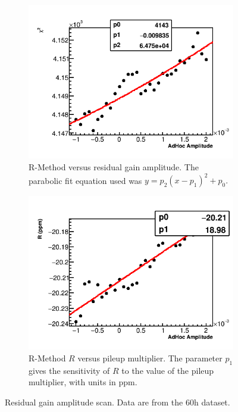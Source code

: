 \begin{figure}[h]
    \begin{subfigure}[t]{0.45\textwidth}
        \centering
        \includegraphics[width=\textwidth]{FullRatio_Chi2_Vs_AdHocAmplitude_Canv}
        \caption{R-Method \chisq versus residual gain amplitude. The parabolic fit equation used was $y = p_{2}(x - p_{1})^{2} + p_{0}.$}
    \end{subfigure}%
    \hspace{1cm}
    \begin{subfigure}[t]{0.45\textwidth}
        \centering
        \includegraphics[width=\textwidth]{FullRatio_R_Vs_AdHocAmplitude_Canv}
        \caption{R-Method $R$ versus pileup multiplier. The parameter $p_{1}$ gives the sensitivity of $R$ to the value of the pileup multiplier, with units in ppm.}
    \end{subfigure}
\caption[]{Residual gain amplitude scan. Data are from the 60h dataset.}
\label{fig:AdHocGainScan}
\end{figure}



